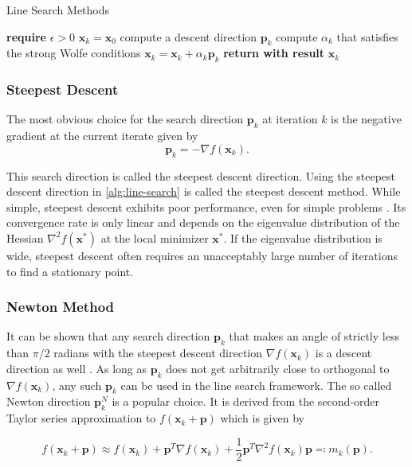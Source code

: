 \begin{algorithm}
\caption{Line Search Methods}\label{alg:line-search}
\begin{algorithmic}
\State \textbf{require } $\epsilon > 0$
\State $\bm{x}_k = \bm{x}_0$
\State compute a descent direction $\bm{p}_k$
\State compute $\alpha_k$ that satisfies the strong Wolfe conditions
\State $\bm{x}_k = \bm{x}_k + \alpha_k \bm{p}_k$
\EndWhile
\State \textbf{return with result } $\bm{x}_k$
\EndProcedure
\end{algorithmic}
\end{algorithm}

\subsubsection{Steepest Descent}\label{sss:steepest-descent}
The most obvious choice for the search direction $\bm{p}_k$ at iteration $k$ is the negative gradient at the current iterate given by 
\[
    \bm{p}_k = -\nabla f(\bm{x}_k).
\]

\noindent This search direction is called the steepest descent direction. Using the steepest descent direction in \cref{alg:line-search} 
is called the steepest descent method. While simple, steepest descent exhibits poor performance, even for simple problems \cite{nocedal2006}. 
Its convergence rate is only linear and depends on the eigenvalue distribution of the Hessian $\nabla^2 f(\bm{x}^*)$ at the local minimizer
$\bm{x}^*$. If the eigenvalue distribution is wide, steepest descent often requires an unacceptably large number of iterations to find a 
stationary point.

\subsubsection{Newton Method}\label{sss:newton-method}
It can be shown that any search direction $\bm{p}_k$ that makes an angle of strictly less than $\pi/2$ radians with the steepest descent
direction $\nabla f(\bm{x}_k)$ is a descent direction as well \cite{nocedal2006}. As long as $\bm{p}_k$ does not get arbitrarily close to 
orthogonal to $\nabla f(\bm{x}_k)$, any such $\bm{p}_k$ can be used in the line search framework. The so called Newton direction $\bm{p}^N_k$ 
is a popular choice. It is derived from the second-order Taylor series approximation to $f(\bm{x}_k + \bm{p})$ which is given by

\begin{equation}\label{eq:newton-model}
    f(\bm{x}_k + \bm{p}) \approx f(\bm{x}_k) + \bm{p}^T \nabla f(\bm{x}_k) + \frac{1}{2}\bm{p}^T \nabla^2 f(\bm{x}_k) \bm{p} \eqqcolon 
    m_k(\bm{p}).
\end{equation}

